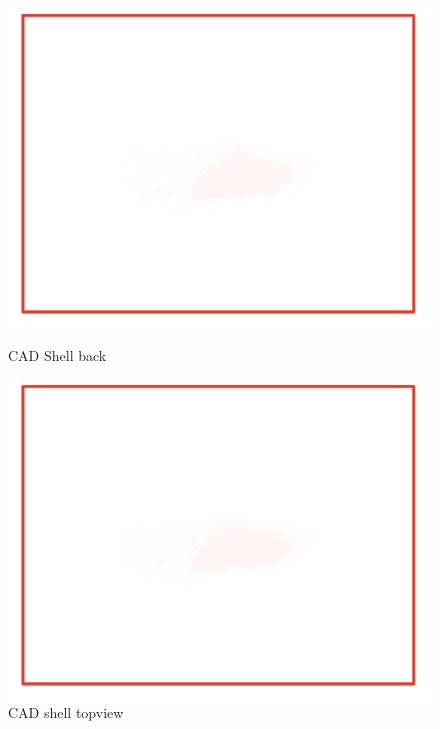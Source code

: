 \begin{figure}[!ht]
  \centering
  \begin{minipage}[b]{0.45\linewidth}
    \includegraphics[width=\linewidth]{texfiles/mech/eimg/aerodynamics/shell_rear}
    \caption{CAD Shell back}
    \label{fig:shell_back}
  \end{minipage}
  \hspace{0.5cm}
  \begin{minipage}[b]{0.45\linewidth}
    \includegraphics[width=\linewidth]{texfiles/mech/eimg/aerodynamics/shell_topview}
    \caption{CAD shell topview}
    \label{fig:shell_topview}
  \end{minipage}
\end{figure}

